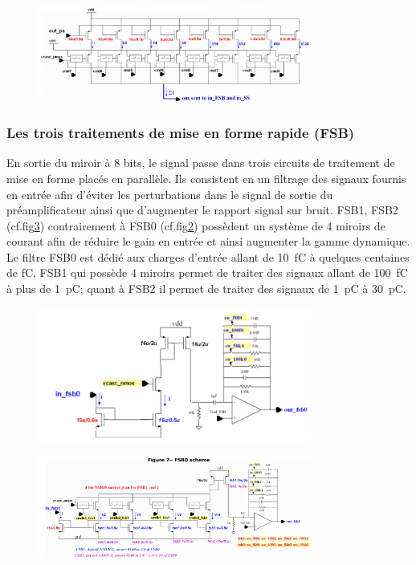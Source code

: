 \begin{figure}[ht!]
	\centering
	\includegraphics[width=0.8\textwidth]{GLA/miror.png}
	\label{mirror}
\end{figure}

\subsubsection{Les trois traitements de mise en forme rapide (FSB)}
En sortie du miroir à \num{8} bits, le signal passe dans trois circuits de traitement de mise en forme placés en parallèle. Ils consistent en un filtrage des signaux fournis en entrée afin d'éviter les perturbations dans le signal de sortie du préamplificateur ainsi que d'augmenter le rapport signal sur bruit. FSB1, FSB2 (cf.fig\ref{fsb1}) contrairement à FSB0 (cf.fig\ref{fsb0}) possèdent un système de \num{4} miroirs de courant afin de réduire le gain en entrée et ainsi augmenter la gamme dynamique. Le filtre FSB0 est dédié aux charges d'entrée allant de \SI{10}{\femto\coulomb} à quelques centaines de \si{\femto\coulomb}, FSB1 qui possède \num{4} miroirs permet de traiter des signaux allant de \SI{100}{\femto\coulomb} à plus de \SI{1}{\pico\coulomb}; quant à FSB2 il permet de traiter des signaux de \SI{1}{\pico\coulomb} à \SI{30}{\pico\coulomb}.
\begin{figure}[ht!]
	\centering
	\includegraphics[width=0.8\textwidth]{GLA/FSB0.png}
	\label{fsb0}
\end{figure}
\begin{figure}[ht!]
	\centering
	\includegraphics[width=0.8\textwidth]{GLA/FSB1.png}
	\label{fsb1}
\end{figure}
